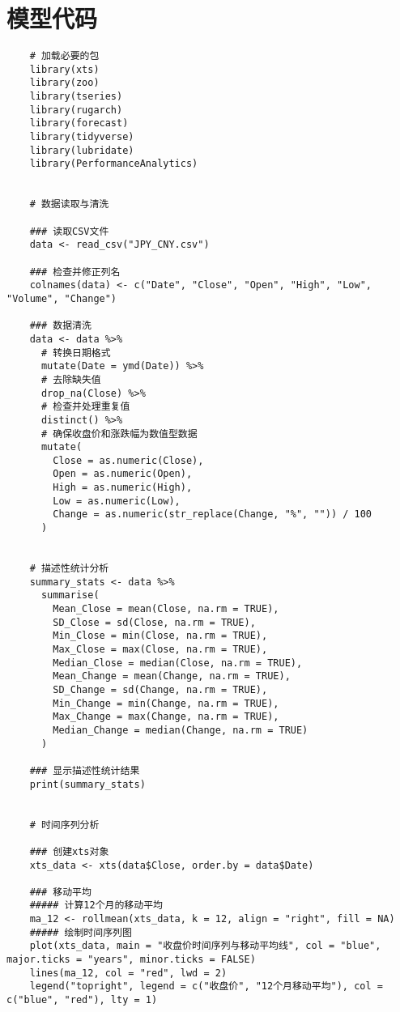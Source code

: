 \section{模型代码}
\begin{lstlisting}
    # 加载必要的包
    library(xts)
    library(zoo)
    library(tseries)
    library(rugarch)
    library(forecast)
    library(tidyverse)
    library(lubridate)
    library(PerformanceAnalytics)
    
    
    # 数据读取与清洗
    
    ### 读取CSV文件
    data <- read_csv("JPY_CNY.csv")
    
    ### 检查并修正列名
    colnames(data) <- c("Date", "Close", "Open", "High", "Low", "Volume", "Change")
    
    ### 数据清洗
    data <- data %>%
      # 转换日期格式
      mutate(Date = ymd(Date)) %>%
      # 去除缺失值
      drop_na(Close) %>%
      # 检查并处理重复值
      distinct() %>%
      # 确保收盘价和涨跌幅为数值型数据
      mutate(
        Close = as.numeric(Close),
        Open = as.numeric(Open),
        High = as.numeric(High),
        Low = as.numeric(Low),
        Change = as.numeric(str_replace(Change, "%", "")) / 100
      )
    
    
    # 描述性统计分析
    summary_stats <- data %>%
      summarise(
        Mean_Close = mean(Close, na.rm = TRUE),
        SD_Close = sd(Close, na.rm = TRUE),
        Min_Close = min(Close, na.rm = TRUE),
        Max_Close = max(Close, na.rm = TRUE),
        Median_Close = median(Close, na.rm = TRUE),
        Mean_Change = mean(Change, na.rm = TRUE),
        SD_Change = sd(Change, na.rm = TRUE),
        Min_Change = min(Change, na.rm = TRUE),
        Max_Change = max(Change, na.rm = TRUE),
        Median_Change = median(Change, na.rm = TRUE)
      )
    
    ### 显示描述性统计结果
    print(summary_stats)
    
    
    # 时间序列分析
    
    ### 创建xts对象
    xts_data <- xts(data$Close, order.by = data$Date)
    
    ### 移动平均
    ##### 计算12个月的移动平均
    ma_12 <- rollmean(xts_data, k = 12, align = "right", fill = NA)
    ##### 绘制时间序列图
    plot(xts_data, main = "收盘价时间序列与移动平均线", col = "blue", major.ticks = "years", minor.ticks = FALSE)
    lines(ma_12, col = "red", lwd = 2)
    legend("topright", legend = c("收盘价", "12个月移动平均"), col = c("blue", "red"), lty = 1)
    

\end{lstlisting}
